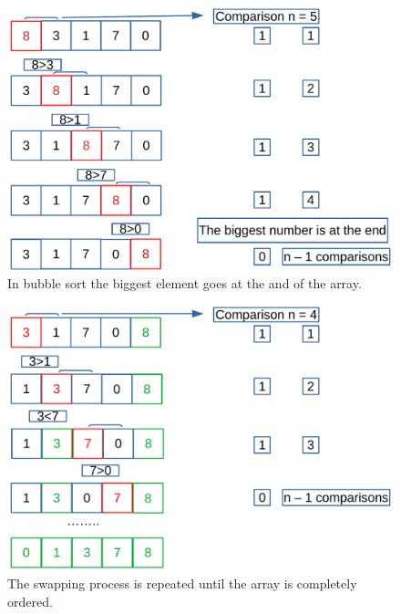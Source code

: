 \begin{figure}[H]
	\begin{center}
		\includegraphics[scale=.6]{chapters/searchandsorting/images/sorting_4.pdf}
		\caption[Bubble sort algorithm.]{In bubble sort the biggest element goes at the and of the array.}
		\label{sorting_4}
	\end{center}
\end{figure}

\begin{figure}[H]
	\begin{center}
		\includegraphics[scale=.6]{chapters/searchandsorting/images/sorting_5.pdf}
		\caption[The swapping process is repeated until the array is completely ordered.]{The swapping process is repeated until the array is completely ordered.}
		\label{sorting_5}
	\end{center}
\end{figure}

